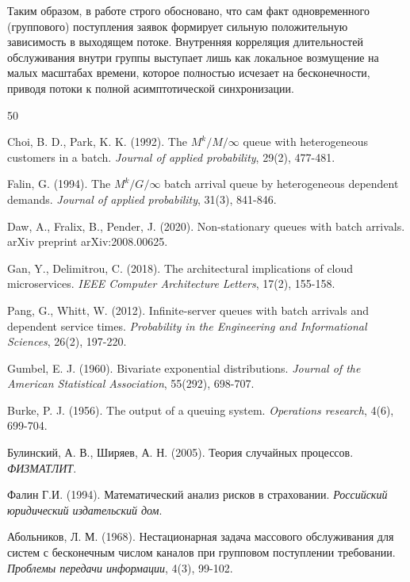 \documentclass[12pt]{article}
\theoremstyle{plain}
\theoremstyle{definition}
\theoremstyle{remark}
\begin{document}
Таким образом, в работе строго обосновано, что сам факт одновременного (группового) поступления заявок формирует сильную положительную зависимость в выходящем потоке. Внутренняя корреляция длительностей обслуживания внутри группы выступает лишь как локальное возмущение на малых масштабах времени, которое полностью исчезает на бесконечности, приводя потоки к полной асимптотической синхронизации. 

\newpage

\begin{thebibliography}{50}

Choi, B. D., Park, K. K. (1992). The $M^k/M/\infty$ queue with heterogeneous customers in a batch. \textit{Journal of applied probability}, 29(2), 477-481.

Falin, G. (1994). The $M^k/G/\infty$ batch arrival queue by heterogeneous dependent demands. \textit{Journal of applied probability}, 31(3), 841-846.

Daw, A., Fralix, B., Pender, J. (2020). Non-stationary queues with batch arrivals. arXiv preprint arXiv:2008.00625.



Gan, Y., Delimitrou, C. (2018). The architectural implications of cloud microservices. \textit{IEEE Computer Architecture Letters}, 17(2), 155-158.

Pang, G.,  Whitt, W. (2012). Infinite-server queues with batch arrivals and dependent service times. \textit{Probability in the Engineering and Informational Sciences}, 26(2), 197-220.

Gumbel, E. J. (1960). Bivariate exponential distributions. \textit{Journal of the American Statistical Association}, 55(292), 698-707.


Burke, P. J. (1956). The output of a queuing system. \textit{Operations research}, 4(6), 699-704.

Булинский, А. В., Ширяев, А. Н. (2005). Теория случайных процессов. \textit{ФИЗМАТЛИТ}.

Фалин Г.И. (1994). Математический анализ рисков в страховании. \textit{Российский юридический издательский дом}.

Абольников, Л. М. (1968). Нестационарная задача массового обслуживания для систем с бесконечным числом каналов при групповом поступлении требовании. \textit{Проблемы передачи информации}, 4(3), 99-102.
\end{thebibliography}
\end{document}
